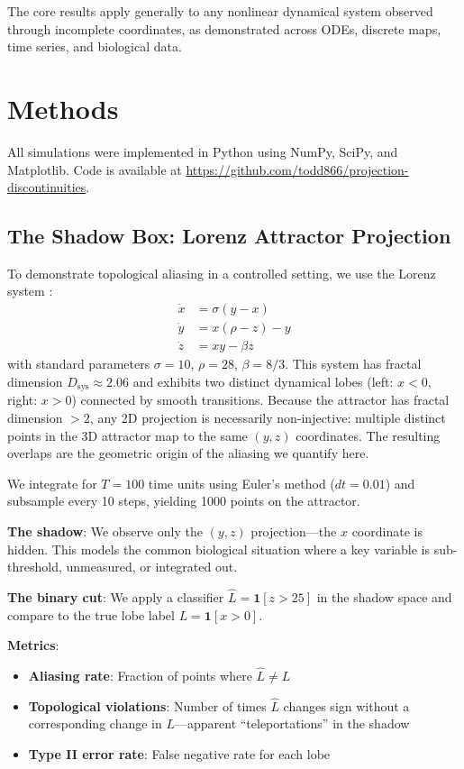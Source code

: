 \documentclass[12pt]{article}
\begin{document}
The core results apply generally to any nonlinear dynamical system observed through incomplete coordinates, as demonstrated across ODEs, discrete maps, time series, and biological data.

\section{Methods}

All simulations were implemented in Python using NumPy, SciPy, and Matplotlib. Code is available at \url{https://github.com/todd866/projection-discontinuities}.

\subsection{The Shadow Box: Lorenz Attractor Projection}

To demonstrate topological aliasing in a controlled setting, we use the Lorenz system \cite{lorenz1963}:
\begin{align}
\dot{x} &= \sigma(y - x) \\
\dot{y} &= x(\rho - z) - y \\
\dot{z} &= xy - \beta z
\end{align}
with standard parameters $\sigma = 10$, $\rho = 28$, $\beta = 8/3$. This system has fractal dimension $D_{\text{sys}} \approx 2.06$ and exhibits two distinct dynamical lobes (left: $x < 0$, right: $x > 0$) connected by smooth transitions. Because the attractor has fractal dimension $>2$, any 2D projection is necessarily non-injective: multiple distinct points in the 3D attractor map to the same $(y, z)$ coordinates. The resulting overlaps are the geometric origin of the aliasing we quantify here.

We integrate for $T = 100$ time units using Euler's method ($dt = 0.01$) and subsample every 10 steps, yielding 1000 points on the attractor.

\textbf{The shadow}: We observe only the $(y, z)$ projection---the $x$ coordinate is hidden. This models the common biological situation where a key variable is sub-threshold, unmeasured, or integrated out.

\textbf{The binary cut}: We apply a classifier $\hat{L} = \mathbf{1}[z > 25]$ in the shadow space and compare to the true lobe label $L = \mathbf{1}[x > 0]$.

\textbf{Metrics}:
\begin{itemize}
    \item \textbf{Aliasing rate}: Fraction of points where $\hat{L} \neq L$
    \item \textbf{Topological violations}: Number of times $\hat{L}$ changes sign without a corresponding change in $L$---apparent ``teleportations'' in the shadow
    \item \textbf{Type II error rate}: False negative rate for each lobe
\end{itemize}
\end{document}
